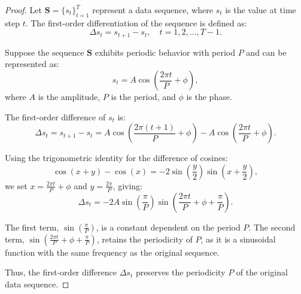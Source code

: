 \begin{proof}
Let $\bm{S} = \{s_t\}_{t=1}^T$ represent a data sequence, where $s_t$ is the value at time step $t$. The first-order differentiation of the sequence is defined as:
\begin{equation}
\Delta s_t = s_{t+1} - s_t, \quad t = 1, 2, \ldots, T-1.
\end{equation}

Suppose the sequence $\bm{S}$ exhibits periodic behavior with period $P$ and can be represented as:
\begin{equation}
s_t = A \cos\left(\frac{2\pi t}{P} + \phi\right),
\end{equation}
where $A$ is the amplitude, $P$ is the period, and $\phi$ is the phase.

The first-order difference of $s_t$ is:
\begin{equation}
\Delta s_t = s_{t+1} - s_t = A \cos\left(\frac{2\pi (t+1)}{P} + \phi\right) - A \cos\left(\frac{2\pi t}{P} + \phi\right).
\end{equation}

Using the trigonometric identity for the difference of cosines:
\begin{equation}
\cos(x + y) - \cos(x) = -2 \sin\left(\frac{y}{2}\right) \sin\left(x + \frac{y}{2}\right),
\end{equation}
we set $x = \frac{2\pi t}{P} + \phi$ and $y = \frac{2\pi}{P}$, giving:
\begin{equation}
\Delta s_t = -2A \sin\left(\frac{\pi}{P}\right) \sin\left(\frac{2\pi t}{P} + \phi + \frac{\pi}{P}\right).
\end{equation}

The first term, $\sin\left(\frac{\pi}{P}\right)$, is a constant dependent on the period $P$. The second term, $\sin\left(\frac{2\pi t}{P} + \phi + \frac{\pi}{P}\right)$, retains the periodicity of $P$, as it is a sinusoidal function with the same frequency as the original sequence.

Thus, the first-order difference $\Delta s_t$ preserves the periodicity $P$ of the original data sequence.
\end{proof}




